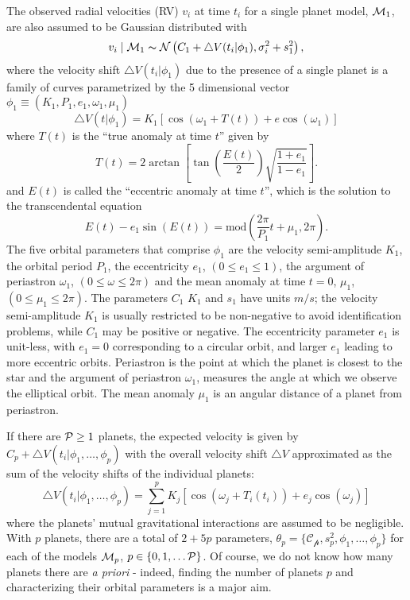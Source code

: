 The observed radial velocities (RV) $v_i$ at time $t_i$
for a single planet model, $\M_1$, are also assumed to be Gaussian
distributed  with
\begin{equation}\label{Velocity_Model}
v_i \mid \M_1 \ind \mathcal{N}\left(C_1 +\bigtriangleup
V(t_i|\phi_1),\sigma_i^2+s_1^2\right),
\end{equation}
where the velocity shift $\bigtriangleup
V(t_i|\phi_1)$ due to the presence of a single planet is
a  family of curves parametrized by the 5 dimensional vector
$\phi_1 \equiv (K_1,P_1,e_1,\omega_1,\mu_1)$
\begin{equation}\label{Velocity_1p_Model}
\bigtriangleup V(t|\phi_1)=K_1[\cos(\omega_1+T(t))+e\cos(\omega_1)]
\end{equation}
where $T(t)$ is the ``true anomaly at time $t$'' given by
\begin{equation}\label{true_anomaly}
T(t)=2\arctan\left[\tan(\frac{E(t)}{2})\sqrt{\frac{1+e_1}{1-e_1}}\right].
\end{equation}
and $E(t)$ is called the ``eccentric anomaly at time $t$'', which is the
solution to the transcendental equation
\begin{equation}\label{transcendental_equation}
E(t)-e_1\sin(E(t))=\mbox{mod}\left(\frac{2\pi}{P_1}t+\mu_1,2\pi\right).
\end{equation}
The five orbital parameters that comprise $\phi_1$ are the velocity
semi-amplitude $K_1$, the orbital period $P_1$, the eccentricity $e_1$,
$(0\leq e_1 \le 1)$, the argument of periastron $\omega_1$, $(0\le \omega
\le 2\pi)$ and the mean anomaly at time $t=0$, $\mu_1$, $(0\le \mu_1
\le 2\pi)$.  The parameters $C_1$ $K_1$ and $s_1$ have units $m/s$;
the velocity semi-amplitude $K_1$ is usually restricted to be
non-negative to avoid identification problems, while $C_1$ may be
positive or negative.  The eccentricity parameter $e_1$ is unit-less,
with $e_1 = 0$ corresponding to a circular orbit, and larger $e_1$ leading
to more eccentric orbits. Periastron is the point at which the planet
is closest to the star and the argument of periastron $\omega_1$, measures
the angle at which we observe the elliptical orbit.  The mean anomaly $\mu_1$ is
an angular distance of a planet from periastron. 

If there are $\P \ge 1$ planets, the expected velocity is given by $C_p
+ \bigtriangleup V(t_i|\phi_1,\ldots,\phi_p)$ with the overall velocity shift
$\bigtriangleup V$  approximated as the sum of the velocity
shifts of the individual planets:
\begin{equation}\label{Velocity_2p_Model}
\bigtriangleup V(t_i|\phi_1,\ldots,\phi_p)=\sum_{j=1}^p
K_j[\cos(\omega_j+T_i(t_i))+e_j\cos(\omega_j)]
\end{equation}
where the planets' mutual gravitational interactions are assumed to be
negligible.  With $p$ planets, there are a total of $2+5p$ parameters,
$\theta_p = \{ \mathcal{C_p},s_p^2,\phi_1,\ldots,\phi_p\}$ for each of
the models $\M_p$, $p \in \{0, 1, \ldots \P\}$. Of course, we do not
know how many planets there are \emph{a priori} - indeed, finding the
number of planets $p$ and characterizing their orbital parameters is
a major aim.

